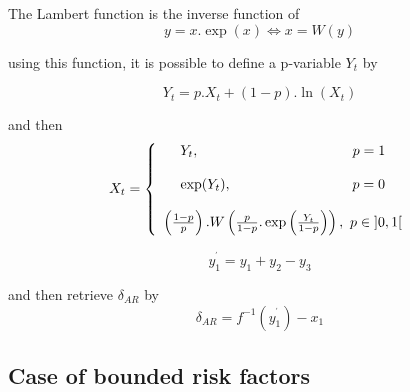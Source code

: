 \documentclass[3pt]{article}
\begin{document}
\bigskip

\bigskip

\bigskip

The Lambert function is the inverse function of 
\begin{equation*}
y=x.\exp (x)\Longleftrightarrow x=W(y)
\end{equation*}

\bigskip using this function, it is possible to define a p-variable $Y_{t}$
by

\bigskip

\begin{equation*}
Y_{t}=p.X_{t}+(1-p).\ln (X_{t})
\end{equation*}

and then%
\begin{equation*}
X_{t}=\left\{ 
\begin{array}{c}
Y_{t},\text{ \ \ \ \ \ \ \ \ \ \ \ \ \ \ \ \ \ \ \ \ \ \ \ \ \ \ \ \ \ \ \ \ 
}p=1 \\ 
\\ 
\exp (Y_{t}),\text{ \ \ \ \ \ \ \ \ \ \ \ \ \ \ \ \ \ \ \ \ \ \ \ \ \ }p=0
\\ 
\\ 
\left( \frac{1-p}{p}\right) .W\left( \frac{p}{1-p}.\exp \left( \frac{Y_{t}}{%
1-p}\right) \right) ,\text{ }p\in \left] 0,1\right[%
\end{array}%
\right.
\end{equation*}

\begin{equation*}
y_{1}^{^{\prime }}=y_{1}+y_{2}-y_{3}
\end{equation*}

and then retrieve $\delta _{AR}$ by%
\begin{equation*}
\delta _{AR}=f^{-1}\left( y_{1}^{^{\prime }}\right) -x_{1}
\end{equation*}

\subsection{Case of bounded risk factors}
\end{document}
